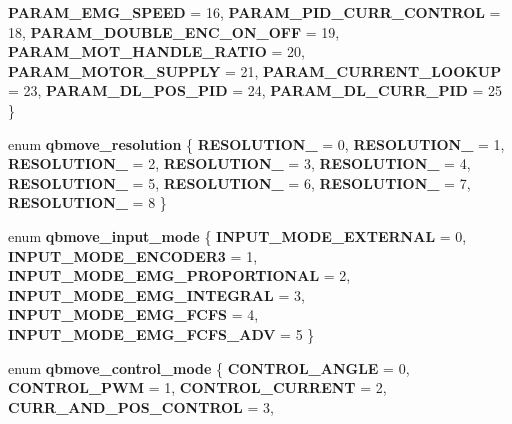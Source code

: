 \begin{DoxyCompactItemize}
\textbf{ P\+A\+R\+A\+M\+\_\+\+E\+M\+G\+\_\+\+S\+P\+E\+ED} = 16, 
\textbf{ P\+A\+R\+A\+M\+\_\+\+P\+I\+D\+\_\+\+C\+U\+R\+R\+\_\+\+C\+O\+N\+T\+R\+OL} = 18, 
\textbf{ P\+A\+R\+A\+M\+\_\+\+D\+O\+U\+B\+L\+E\+\_\+\+E\+N\+C\+\_\+\+O\+N\+\_\+\+O\+FF} = 19, 
\textbf{ P\+A\+R\+A\+M\+\_\+\+M\+O\+T\+\_\+\+H\+A\+N\+D\+L\+E\+\_\+\+R\+A\+T\+IO} = 20, 
\newline
\textbf{ P\+A\+R\+A\+M\+\_\+\+M\+O\+T\+O\+R\+\_\+\+S\+U\+P\+P\+LY} = 21, 
\textbf{ P\+A\+R\+A\+M\+\_\+\+C\+U\+R\+R\+E\+N\+T\+\_\+\+L\+O\+O\+K\+UP} = 23, 
\textbf{ P\+A\+R\+A\+M\+\_\+\+D\+L\+\_\+\+P\+O\+S\+\_\+\+P\+ID} = 24, 
\textbf{ P\+A\+R\+A\+M\+\_\+\+D\+L\+\_\+\+C\+U\+R\+R\+\_\+\+P\+ID} = 25
 \}
\item 
\mbox{\label{commands_8h_ad18f2ef316ee226b52882af5758c39e8}} 
enum {\bfseries qbmove\+\_\+resolution} \{ \newline
{\bfseries R\+E\+S\+O\+L\+U\+T\+I\+O\+N\+\_} = 0, 
{\bfseries R\+E\+S\+O\+L\+U\+T\+I\+O\+N\+\_} = 1, 
{\bfseries R\+E\+S\+O\+L\+U\+T\+I\+O\+N\+\_} = 2, 
{\bfseries R\+E\+S\+O\+L\+U\+T\+I\+O\+N\+\_} = 3, 
\newline
{\bfseries R\+E\+S\+O\+L\+U\+T\+I\+O\+N\+\_} = 4, 
{\bfseries R\+E\+S\+O\+L\+U\+T\+I\+O\+N\+\_} = 5, 
{\bfseries R\+E\+S\+O\+L\+U\+T\+I\+O\+N\+\_} = 6, 
{\bfseries R\+E\+S\+O\+L\+U\+T\+I\+O\+N\+\_} = 7, 
\newline
{\bfseries R\+E\+S\+O\+L\+U\+T\+I\+O\+N\+\_} = 8
 \}
\item 
enum \textbf{ qbmove\+\_\+input\+\_\+mode} \{ \newline
\textbf{ I\+N\+P\+U\+T\+\_\+\+M\+O\+D\+E\+\_\+\+E\+X\+T\+E\+R\+N\+AL} = 0, 
\textbf{ I\+N\+P\+U\+T\+\_\+\+M\+O\+D\+E\+\_\+\+E\+N\+C\+O\+D\+E\+R3} = 1, 
\textbf{ I\+N\+P\+U\+T\+\_\+\+M\+O\+D\+E\+\_\+\+E\+M\+G\+\_\+\+P\+R\+O\+P\+O\+R\+T\+I\+O\+N\+AL} = 2, 
\textbf{ I\+N\+P\+U\+T\+\_\+\+M\+O\+D\+E\+\_\+\+E\+M\+G\+\_\+\+I\+N\+T\+E\+G\+R\+AL} = 3, 
\newline
\textbf{ I\+N\+P\+U\+T\+\_\+\+M\+O\+D\+E\+\_\+\+E\+M\+G\+\_\+\+F\+C\+FS} = 4, 
\textbf{ I\+N\+P\+U\+T\+\_\+\+M\+O\+D\+E\+\_\+\+E\+M\+G\+\_\+\+F\+C\+F\+S\+\_\+\+A\+DV} = 5
 \}
\item 
enum \textbf{ qbmove\+\_\+control\+\_\+mode} \{ \newline
\textbf{ C\+O\+N\+T\+R\+O\+L\+\_\+\+A\+N\+G\+LE} = 0, 
\textbf{ C\+O\+N\+T\+R\+O\+L\+\_\+\+P\+WM} = 1, 
\textbf{ C\+O\+N\+T\+R\+O\+L\+\_\+\+C\+U\+R\+R\+E\+NT} = 2, 
\textbf{ C\+U\+R\+R\+\_\+\+A\+N\+D\+\_\+\+P\+O\+S\+\_\+\+C\+O\+N\+T\+R\+OL} = 3, 

\end{DoxyCompactItemize}
